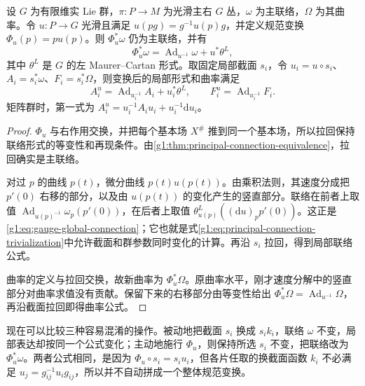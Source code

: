 \begin{proposition}\label{g1:prop:gauge-connection-formula}
	设 \(G\) 为有限维实 Lie 群，\(\pi:P\to M\) 为光滑主右 \(G\) 丛，\(\omega\) 为主联络，\(\Omega\) 为其曲率。令 \(u:P\to G\) 光滑且满足 \(u(pg)=g^{-1}u(p)g\)，并定义规范变换 \(\Phi_u(p)=pu(p)\)。则 \(\Phi_u^*\omega\) 仍为主联络，并有
	\begin{equation}\label{g1:eq:gauge-global-connection}
		\Phi_u^*\omega=\operatorname{Ad}_{u^{-1}}\omega+u^*\theta^L,
	\end{equation}
	其中 \(\theta^L\) 是 \(G\) 的左 Maurer--Cartan 形式。取固定局部截面 \(s_i\)，令 \(u_i=u\circ s_i\)、\(A_i=s_i^*\omega\)、\(F_i=s_i^*\Omega\)，则变换后的局部形式和曲率满足
	\begin{equation}\label{g1:eq:gauge-local-connection}
		A_i^u=\operatorname{Ad}_{u_i^{-1}}A_i+u_i^*\theta^L,
		\qquad F_i^u=\operatorname{Ad}_{u_i^{-1}}F_i.
	\end{equation}
	矩阵群时，第一式为 \(A_i^u=u_i^{-1}A_i u_i+u_i^{-1}\mathrm{d}u_i\)。
\end{proposition}
\begin{proof}
	\(\Phi_u\) 与右作用交换，并把每个基本场 \(X^\#\) 推到同一个基本场，所以拉回保持联络形式的等变性和再现条件。由\cref{g1:thm:principal-connection-equivalence}，拉回确实是主联络。

	对过 \(p\) 的曲线 \(p(t)\)，微分曲线 \(p(t)u(p(t))\)。由乘积法则，其速度分成把 \(p'(0)\) 右移的部分，以及由 \(u(p(t))\) 的变化产生的竖直部分。联络在前者上取值 \(\operatorname{Ad}_{u(p)^{-1}}\omega_p(p'(0))\)，在后者上取值 \(\theta^L_{u(p)}((\mathrm{d}u)_p p'(0))\)。这正是\eqref{g1:eq:gauge-global-connection}；它也就是式\eqref{g1:eq:principal-connection-trivialization}中允许截面和群参数同时变化的计算。再沿 \(s_i\) 拉回，得到局部联络公式。

	曲率的定义与拉回交换，故新曲率为 \(\Phi_u^*\Omega\)。原曲率水平，刚才速度分解中的竖直部分对曲率求值没有贡献。保留下来的右移部分由等变性给出 \(\Phi_u^*\Omega=\operatorname{Ad}_{u^{-1}}\Omega\)，再沿截面拉回即得曲率公式。
\end{proof}

现在可以比较三种容易混淆的操作。被动地把截面 \(s_i\) 换成 \(s_i k_i\)，联络 \(\omega\) 不变，局部表达却按同一个公式变化；主动地施行 \(\Phi_u\)，则保持所选 \(s_i\) 不变，把联络改为 \(\Phi_u^*\omega\)。两者公式相同，是因为 \(\Phi_u\circ s_i=s_i u_i\)，但各片任取的换截面函数 \(k_i\) 不必满足 \(u_j=g_{ij}^{-1}u_i g_{ij}\)，所以并不自动拼成一个整体规范变换。

\ProseParagraphBreak

